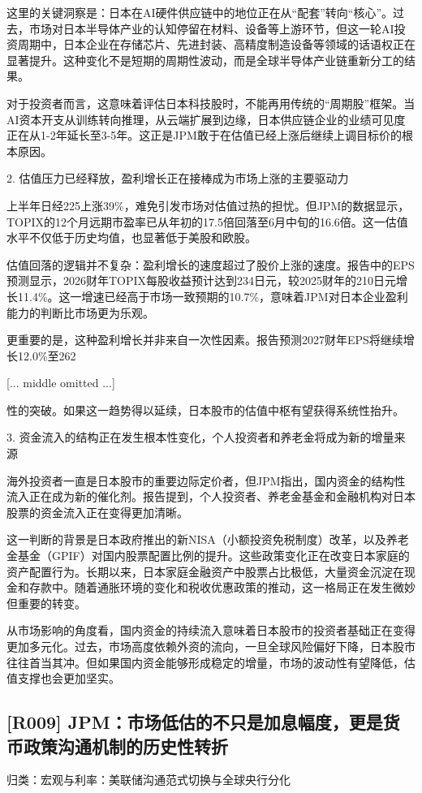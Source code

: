 \documentclass[11pt]{ctexart}
\begin{document}
这里的关键洞察是：日本在AI硬件供应链中的地位正在从“配套”转向“核心”。过去，市场对日本半导体产业的认知停留在材料、设备等上游环节，但这一轮AI投资周期中，日本企业在存储芯片、先进封装、高精度制造设备等领域的话语权正在显著提升。这种变化不是短期的周期性波动，而是全球半导体产业链重新分工的结果。

对于投资者而言，这意味着评估日本科技股时，不能再用传统的“周期股”框架。当AI资本开支从训练转向推理，从云端扩展到边缘，日本供应链企业的业绩可见度正在从1-2年延长至3-5年。这正是JPM敢于在估值已经上涨后继续上调目标价的根本原因。

2. 估值压力已经释放，盈利增长正在接棒成为市场上涨的主要驱动力

上半年日经225上涨39\%，难免引发市场对估值过热的担忧。但JPM的数据显示，TOPIX的12个月远期市盈率已从年初的17.5倍回落至6月中旬的16.6倍。这一估值水平不仅低于历史均值，也显著低于美股和欧股。

估值回落的逻辑并不复杂：盈利增长的速度超过了股价上涨的速度。报告中的EPS预测显示，2026财年TOPIX每股收益预计达到234日元，较2025财年的210日元增长11.4\%。这一增速已经高于市场一致预期的10.7\%，意味着JPM对日本企业盈利能力的判断比市场更为乐观。

更重要的是，这种盈利增长并非来自一次性因素。报告预测2027财年EPS将继续增长12.0\%至262

[... middle omitted ...]

性的突破。如果这一趋势得以延续，日本股市的估值中枢有望获得系统性抬升。

3. 资金流入的结构正在发生根本性变化，个人投资者和养老金将成为新的增量来源

海外投资者一直是日本股市的重要边际定价者，但JPM指出，国内资金的结构性流入正在成为新的催化剂。报告提到，个人投资者、养老金基金和金融机构对日本股票的资金流入正在变得更加清晰。

这一判断的背景是日本政府推出的新NISA（小额投资免税制度）改革，以及养老金基金（GPIF）对国内股票配置比例的提升。这些政策变化正在改变日本家庭的资产配置行为。长期以来，日本家庭金融资产中股票占比极低，大量资金沉淀在现金和存款中。随着通胀环境的变化和税收优惠政策的推动，这一格局正在发生微妙但重要的转变。

从市场影响的角度看，国内资金的持续流入意味着日本股市的投资者基础正在变得更加多元化。过去，市场高度依赖外资的流向，一旦全球风险偏好下降，日本股市往往首当其冲。但如果国内资金能够形成稳定的增量，市场的波动性有望降低，估值支撑也会更加坚实。

\subsection{[R009] JPM：市场低估的不只是加息幅度，更是货币政策沟通机制的历史性转折}
{\small\color{refgray}归类：宏观与利率：美联储沟通范式切换与全球央行分化}
\end{document}
